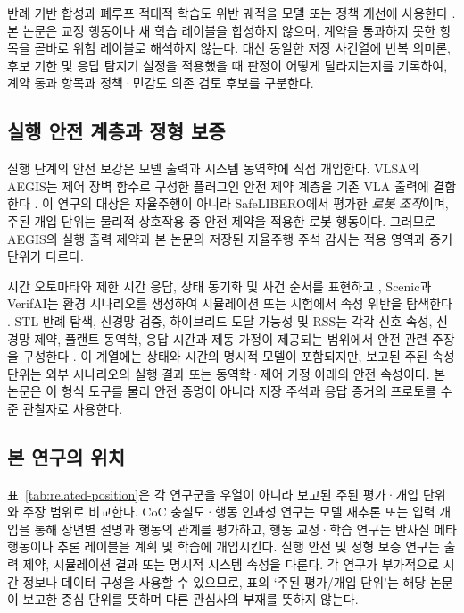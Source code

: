 반례 기반 합성과 폐루프 적대적 학습도 위반 궤적을 모델 또는 정책 개선에 사용한다 \cite{ghosh2020counterexample,zhang2023cat}. 본 논문은 교정 행동이나 새 학습 레이블을 합성하지 않으며, 계약을 통과하지 못한 항목을 곧바로 위험 레이블로 해석하지 않는다. 대신 동일한 저장 사건열에 반복 의미론, 후보 기한 및 응답 탐지기 설정을 적용했을 때 판정이 어떻게 달라지는지를 기록하여, 계약 통과 항목과 정책·민감도 의존 검토 후보를 구분한다.

\subsection{실행 안전 계층과 정형 보증}
실행 단계의 안전 보강은 모델 출력과 시스템 동역학에 직접 개입한다. VLSA의 AEGIS는 제어 장벽 함수로 구성한 플러그인 안전 제약 계층을 기존 VLA 출력에 결합한다 \cite{hu2025vlsa}. 이 연구의 대상은 자율주행이 아니라 SafeLIBERO에서 평가한 \emph{로봇 조작}이며, 주된 개입 단위는 물리적 상호작용 중 안전 제약을 적용한 로봇 행동이다. 그러므로 AEGIS의 실행 출력 제약과 본 논문의 저장된 자율주행 주석 감사는 적용 영역과 증거 단위가 다르다.

시간 오토마타와  제한 시간 응답, 상태 동기화 및 사건 순서를 표현하고 \cite{behrmann2004uppaal}, Scenic과 VerifAI는 환경 시나리오를 생성하여 시뮬레이션 또는 시험에서 속성 위반을 탐색한다 \cite{fremont2019scenic,dreossi2019verifai,fremont2020formal}. STL 반례 탐색, 신경망 검증, 하이브리드 도달 가능성 및 RSS는 각각 신호 속성, 신경망 제약, 플랜트 동역학, 응답 시간과 제동 가정이 제공되는 범위에서 안전 관련 주장을 구성한다 \cite{donze2010robustness,katz2019marabou,ivanov2019verisig,shalev2017rss}. 이 계열에는 상태와 시간의 명시적 모델이 포함되지만, 보고된 주된 속성 단위는 외부 시나리오의 실행 결과 또는 동역학·제어 가정 아래의 안전 속성이다. 본 논문은 이 형식 도구를 물리 안전 증명이 아니라 저장 주석과 응답 증거의 프로토콜 수준 관찰자로 사용한다.

\subsection{본 연구의 위치}
표~\ref{tab:related-position}은 각 연구군을 우열이 아니라 보고된 주된 평가·개입 단위와 주장 범위로 비교한다. CoC 충실도·행동 인과성 연구는 모델 재추론 또는 입력 개입을 통해 장면별 설명과 행동의 관계를 평가하고, 행동 교정·학습 연구는 반사실 메타 행동이나 추론 레이블을 계획 및 학습에 개입시킨다. 실행 안전 및 정형 보증 연구는 출력 제약, 시뮬레이션 결과 또는 명시적 시스템 속성을 다룬다. 각 연구가 부가적으로 시간 정보나 데이터 구성을 사용할 수 있으므로, 표의 `주된 평가/개입 단위'는 해당 논문이 보고한 중심 단위를 뜻하며 다른 관심사의 부재를 뜻하지 않는다.

